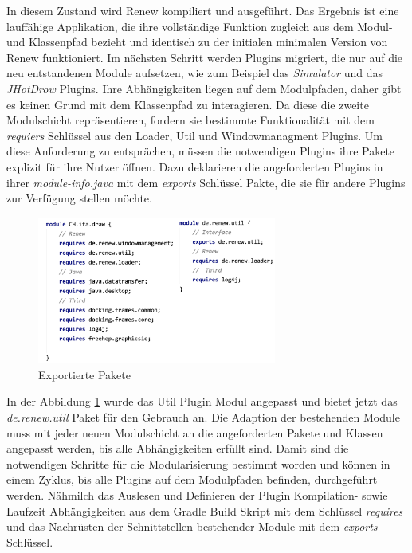 	In diesem Zustand wird Renew kompiliert und ausgeführt. Das Ergebnis ist eine lauffähige Applikation, die ihre vollständige Funktion zugleich aus dem Modul- und Klassenpfad bezieht und identisch zu der initialen minimalen Version von Renew funktioniert.\newline
	Im nächsten Schritt werden Plugins migriert, die nur auf die neu entstandenen Module aufsetzen, wie zum Beispiel das \textit{Simulator} und das \textit{JHotDrow} Plugins. Ihre Abhängigkeiten liegen auf dem Modulpfaden, daher gibt es keinen Grund mit dem Klassenpfad zu interagieren. \newline
	Da diese die zweite Modulschicht repräsentieren, fordern sie bestimmte Funktionalität mit dem \textit{requiers} Schlüssel aus den Loader, Util und Windowmanagment Plugins. Um diese Anforderung zu entsprächen, müssen die notwendigen Plugins ihre Pakete  explizit für ihre Nutzer öffnen. Dazu deklarieren die angeforderten Plugins in ihrer \textit{module-info.java} mit dem \textit{exports} Schlüssel Pakte, die sie für andere Plugins zur Verfügung stellen möchte.

	\begin{figure}[h!]
	  \centering
	  \includegraphics[width=0.7\textwidth]{material/images/utilCH-info.png}
	  \caption{Exportierte Pakete}
	  \label{fig:utilCH}
	\end{figure}

	In der Abbildung \ref{fig:utilCH} wurde das Util Plugin Modul angepasst und bietet jetzt das \textit{de.renew.util} Paket für den Gebrauch an.\newline
	Die Adaption der bestehenden Module muss mit jeder neuen Modulschicht an die angeforderten Pakete und Klassen angepasst werden, bis alle Abhängigkeiten erfüllt sind.\newline
	Damit sind die notwendigen Schritte für die Modularisierung bestimmt worden und können in einem Zyklus, bis alle Plugins auf dem Modulpfaden befinden, durchgeführt werden. Nähmilch das Auslesen und Definieren der Plugin Kompilation- sowie Laufzeit Abhängigkeiten aus dem Gradle Build Skript mit dem Schlüssel \textit{requires} und das Nachrüsten der Schnittstellen bestehender Module mit dem \textit{exports} Schlüssel. \bigbreak

